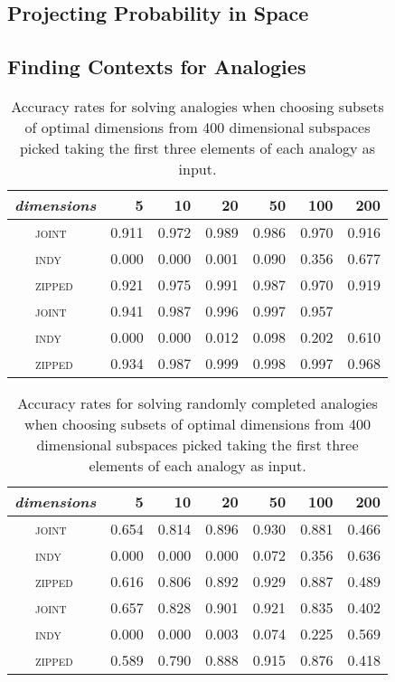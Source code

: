 \subsection{Projecting Probability in Space}

\subsection{Finding Contexts for Analogies}
\begin{table}
\centering
\begin{tabular}{clrrrrrr}
\hline
\multicolumn{2}{l}{\emph{dimensions}} & 5 & 10 & 20 & 50 & 100 & 200 \\
\hline
\parbox[t]{2mm}{} & \textsc{joint} & 0.911 & 0.972 & 0.989 & 0.986 & 0.970 & 0.916 \\
& \textsc{indy} & 0.000 & 0.000 & 0.001 & 0.090 & 0.356 & 0.677 \\
& \textsc{zipped} & 0.921 & 0.975 & 0.991 & 0.987 & 0.970 & 0.919 \\
\hline
\parbox[t]{2mm}{} & \textsc{joint} & 0.941 & 0.987 & 0.996 & 0.997 & 0.957 \\
& \textsc{indy} & 0.000 & 0.000 & 0.012 & 0.098 & 0.202 & 0.610 \\
& \textsc{zipped} & 0.934 & 0.987 & 0.999 & 0.998 & 0.997 & 0.968 \\
\hline
\end{tabular}
\caption[Finding Spaces for Known Analogies]{Accuracy rates for solving analogies when choosing subsets of optimal dimensions from 400 dimensional subspaces picked taking the first three elements of each analogy as input.}
\end{table}

\begin{table}
\centering
\begin{tabular}{clrrrrrr}
\hline
\multicolumn{2}{l}{\emph{dimensions}} & 5 & 10 & 20 & 50 & 100 & 200 \\
\hline
\parbox[t]{2mm}{} & \textsc{joint} & 0.654 & 0.814 & 0.896 & 0.930 & 0.881 & 0.466 \\
& \textsc{indy} & 0.000 & 0.000 & 0.000 & 0.072 & 0.356 & 0.636 \\
& \textsc{zipped} & 0.616 & 0.806 & 0.892 & 0.929 & 0.887 & 0.489 \\
\hline
\parbox[t]{2mm}{} & \textsc{joint} & 0.657 & 0.828 & 0.901 & 0.921 & 0.835 & 0.402 \\
& \textsc{indy} & 0.000 & 0.000 & 0.003 & 0.074 & 0.225 & 0.569 \\
& \textsc{zipped} & 0.589 & 0.790 & 0.888 & 0.915 & 0.876 & 0.418 \\
\hline
\end{tabular}
\caption[Finding Spaces for Fake Analogies]{Accuracy rates for solving randomly completed analogies when choosing subsets of optimal dimensions from 400 dimensional subspaces picked taking the first three elements of each analogy as input.}
\end{table}

